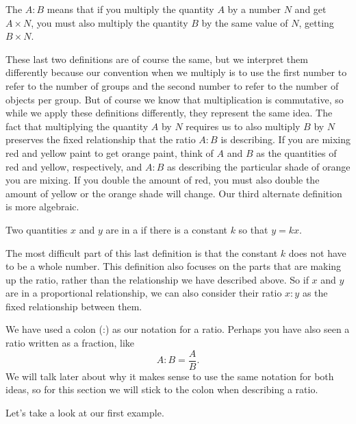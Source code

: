 \documentclass{ximera}
\begin{document}
\begin{definition}
The  $A:B$ means that if  you multiply the quantity $A$ by a number $N$ and get $A \times N$, you must also multiply the quantity $B$ by the same value of $N$, getting $B \times N$. %
\end{definition}
These last two definitions are of course the same, but we interpret them differently because our convention when we multiply is to use the first number to refer to the number of groups and the second number to refer to the number of objects per group. But of course we know that multiplication is commutative, so while we apply these definitions differently, they represent the same idea. The fact that multiplying the quantity $A$ by $N$ requires us to also multiply $B$ by $N$ preserves the fixed relationship that the ratio $A:B$ is describing. If you are mixing red and yellow paint to get orange paint, think of $A$ and $B$ as the quantities of red and yellow, respectively, and $A:B$ as describing the particular shade of orange you are mixing. If you double the amount of red, you must also double the amount of yellow or the orange shade will change. Our third alternate definition is more algebraic.

\begin{definition}
Two quantities $x$ and $y$ are in a  if there is a constant $k$ so that $y = kx$.
\end{definition}
The most difficult part of this last definition is that the constant $k$ does not have to be a whole number. This definition also focuses on the parts that are making up the ratio, rather than the relationship we have described above. So if $x$ and $y$ are in a proportional relationship, we can also consider their ratio $x:y$ as the fixed relationship between them. 

We have used a colon (:) as our notation for a ratio. Perhaps you have also seen a ratio written as a fraction, like
\[
A:B = \frac{A}{B}.
\]
We will talk later about why it makes sense to use the same notation for both ideas, so for this section we will stick to the colon when describing a ratio.

Let's take a look at our first example.
\end{document}
